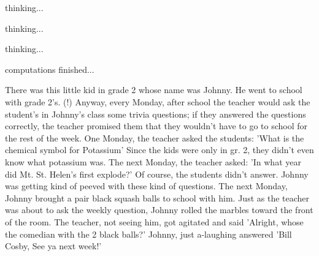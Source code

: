 \documentclass[white]{guildcamp3}
\begin{document}
\name{\wEndWorldFive{}} %

thinking...

thinking...

thinking...

computations finished...
 
 There was this little kid in grade 2 whose name was Johnny.
 He went to school with grade 2's. (!) Anyway, every Monday,
 after school the teacher would ask the student's in Johnny's
 class some trivia questions; if they answered the questions
 correctly, the teacher promised them that they wouldn't have
 to go to school for the rest of the week.
 One Monday, the teacher asked the students:
 'What is the chemical symbol for Potassium'
 Since the kids were only in gr. 2, they didn't even
 know what potassium was. The next Monday, the teacher asked:
 'In what year did Mt. St. Helen's first explode?'
 Of course, the students didn't answer. Johnny was
 getting kind of peeved with these kind of questions. The
 next Monday, Johnny brought a pair black squash balls
 to school with him. Just as the teacher was about to ask
 the weekly question, Johnny rolled the marbles toward the
 front of the room. The teacher, not seeing him, got agitated
 and said 'Alright, whose the comedian with the 2 black
 balls?'
 Johnny, just a-laughing answered 'Bill Cosby, See ya
 next week!'
\end{document}
